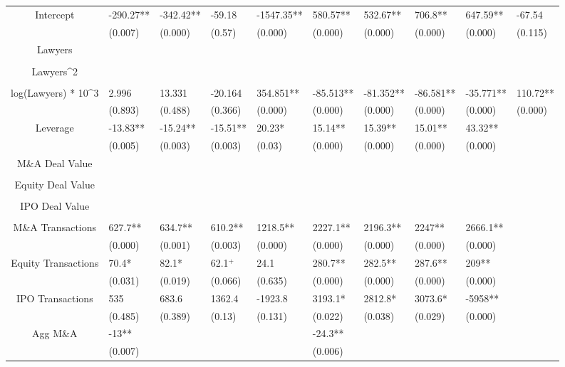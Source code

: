 \documentclass{article}
\begin{document}
\begin{table}[H]
\begin{tabular}{|clllllllll|}
Intercept & -290.27** & -342.42** & -59.18 & -1547.35** & 580.57** & 532.67** & 706.8** & 647.59** & -67.54 \\ 
   & (0.007) & (0.000) & (0.57) & (0.000) & (0.000) & (0.000) & (0.000) & (0.000) & (0.115) \\ 
  Lawyers &  &  &  &  &  &  &  &  &  \\ 
   &  &  &  &  &  &  &  &  &  \\ 
  Lawyers^2 &  &  &  &  &  &  &  &  &  \\ 
   &  &  &  &  &  &  &  &  &  \\ 
  log(Lawyers) * 10^3 & 2.996 & 13.331 & -20.164 & 354.851** & -85.513** & -81.352** & -86.581** & -35.771** & 110.72** \\ 
   & (0.893) & (0.488) & (0.366) & (0.000) & (0.000) & (0.000) & (0.000) & (0.000) & (0.000) \\ 
  Leverage & -13.83** & -15.24** & -15.51** & 20.23* & 15.14** & 15.39** & 15.01** & 43.32** &  \\ 
   & (0.005) & (0.003) & (0.003) & (0.03) & (0.000) & (0.000) & (0.000) & (0.000) &  \\ 
  M\&A Deal Value &  &  &  &  &  &  &  &  &  \\ 
   &  &  &  &  &  &  &  &  &  \\ 
  Equity Deal Value &  &  &  &  &  &  &  &  &  \\ 
   &  &  &  &  &  &  &  &  &  \\ 
  IPO Deal Value &  &  &  &  &  &  &  &  &  \\ 
   &  &  &  &  &  &  &  &  &  \\ 
  M\&A Transactions & 627.7** & 634.7** & 610.2** & 1218.5** & 2227.1** & 2196.3** & 2247** & 2666.1** &  \\ 
   & (0.000) & (0.001) & (0.003) & (0.000) & (0.000) & (0.000) & (0.000) & (0.000) &  \\ 
  Equity Transactions & 70.4* & 82.1* & 62.1$^{+}$ & 24.1 & 280.7** & 282.5** & 287.6** & 209** &  \\ 
   & (0.031) & (0.019) & (0.066) & (0.635) & (0.000) & (0.000) & (0.000) & (0.000) &  \\ 
  IPO Transactions & 535 & 683.6 & 1362.4 & -1923.8 & 3193.1* & 2812.8* & 3073.6* & -5958** &  \\ 
   & (0.485) & (0.389) & (0.13) & (0.131) & (0.022) & (0.038) & (0.029) & (0.000) &  \\ 
  Agg M\&A & -13** &  &  &  & -24.3** &  &  &  &  \\ 
   & (0.007) &  &  &  & (0.006) &  &  &  &  \\ 

\end{tabular}
\end{table}
\end{document}
